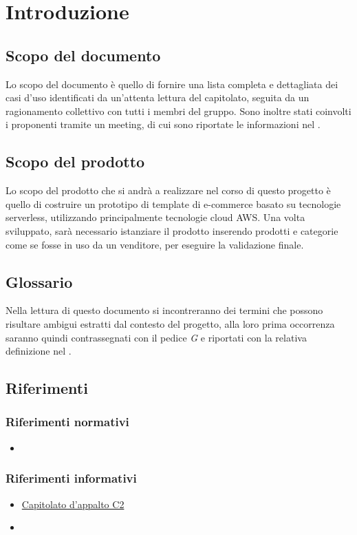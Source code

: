 \section{Introduzione}
\subsection{Scopo del documento}
Lo scopo del documento è quello di fornire una lista completa e dettagliata dei casi d'uso identificati
da un'attenta lettura del capitolato, seguita da un ragionamento collettivo con tutti i membri del gruppo.
Sono inoltre stati coinvolti i proponenti tramite un meeting, di cui sono riportate le informazioni nel .

\subsection{Scopo del prodotto}
Lo scopo del prodotto che si andrà a realizzare nel corso di questo progetto è quello di costruire un prototipo di
template di e-commerce basato su tecnologie serverless, utilizzando principalmente tecnologie cloud AWS.
Una volta sviluppato, sarà necessario istanziare il prodotto inserendo prodotti e categorie come se fosse in uso
da un venditore, per eseguire la validazione finale.

\subsection{Glossario}
Nella lettura di questo documento si incontreranno dei termini che possono risultare ambigui estratti dal contesto
del progetto, alla loro prima occorrenza saranno quindi contrassegnati con il pedice \textit{G} e riportati con la relativa
definizione nel .

\subsection{Riferimenti}
\subsubsection{Riferimenti normativi}
\begin{itemize}
    \item {}
\end{itemize}

\subsubsection{Riferimenti informativi}
\begin{itemize}
    \item \href{https://www.math.unipd.it/~tullio/IS-1/2020/Progetto/C2.pdf}{Capitolato d'appalto C2}
    \item {}
\end{itemize}
